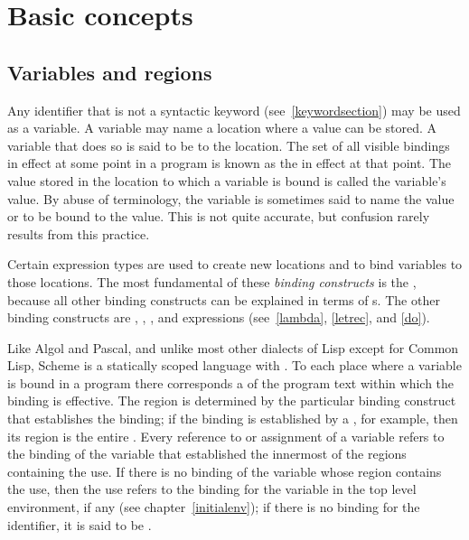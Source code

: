 \chapter{Basic concepts}
\label{basicchapter}

\section{Variables and regions}
\label{specialformsection}
\label{variablesection}

\vest Any identifier that is not a syntactic keyword
(see~\ref{keywordsection}) may be used as a
variable. A variable may name a
location where a value can be stored.  A variable that does so is said
to be  to the location.  The set of all visible
bindings in effect at some point in a program is
known as the  in effect at that point.  The value
stored in the location to which a variable is bound is called the
variable's value.  By abuse of terminology, the variable is sometimes
said to name the value or to be bound to the value.  This is not quite
accurate, but confusion rarely results from this practice.



\vest Certain expression types are used to create new locations and to
bind variables to those locations.  The most fundamental of these {\em
binding constructs} is the
\lambdaexp{}\index{\lambdaexp{}}, because all other binding constructs
can be explained in terms of \lambdaexp{}s.  The other binding
constructs are , , , and 
expressions (see~\ref{lambda}, \ref{letrec}, and \ref{do}).


\vest Like Algol and Pascal, and unlike most other dialects of Lisp
except for Common Lisp, Scheme is a statically scoped language with
.  To each place where a variable is bound
in a program there corresponds a  of the program text
within which the binding is effective.  The region is determined by
the particular binding construct that establishes the binding; if the
binding is established by a \lambdaexp{}, for example, then its region
is the entire \lambdaexp{}.  Every reference to or assignment of a
variable refers to the binding of the variable that established the
innermost of the regions containing the use.  If there is no binding
of the variable whose region contains the use, then the use refers to
the binding for the variable in the top level environment, if any
(see chapter~\ref{initialenv}); if there is no binding for the identifier, it
is said to be .

